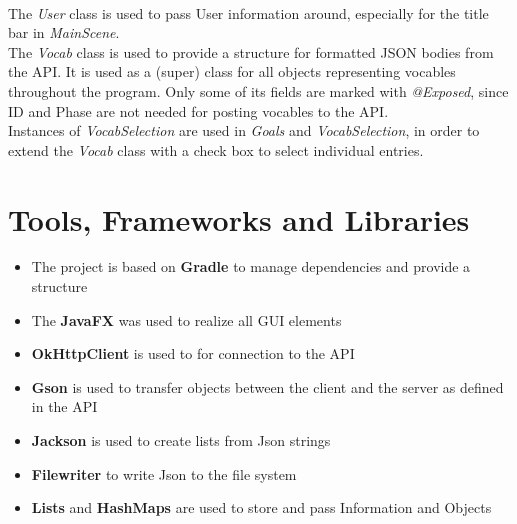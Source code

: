 \\
The \textit{User} class is used to pass User information around, especially for the title bar in \textit{MainScene}.\\
The \textit{Vocab} class is used to provide a structure for formatted JSON bodies from the API. It is used as a (super) class for all objects representing vocables throughout the program. Only some of its fields are marked with \textit{ @Exposed}, since ID and Phase are not needed for posting vocables to the API.\\
Instances of \textit{VocabSelection} are used in \textit{Goals} and \textit{VocabSelection}, in order to extend the \textit{Vocab} class with a check box to select individual entries.

\section{Tools, Frameworks and Libraries}
\begin{itemize}
    \item The project is based on \textbf{Gradle} to manage dependencies and provide a structure
    \item The \textbf{JavaFX} was used to realize all GUI elements
    \item \textbf{OkHttpClient} is used to for connection to the API
    \item \textbf{Gson} is used to transfer objects between the client and the server as defined in the API
    \item \textbf{Jackson} is used to create lists from Json strings
    \item \textbf{Filewriter} to write Json to the file system
    \item \textbf{Lists} and \textbf{HashMaps} are used to store and pass Information and Objects
\end{itemize}
